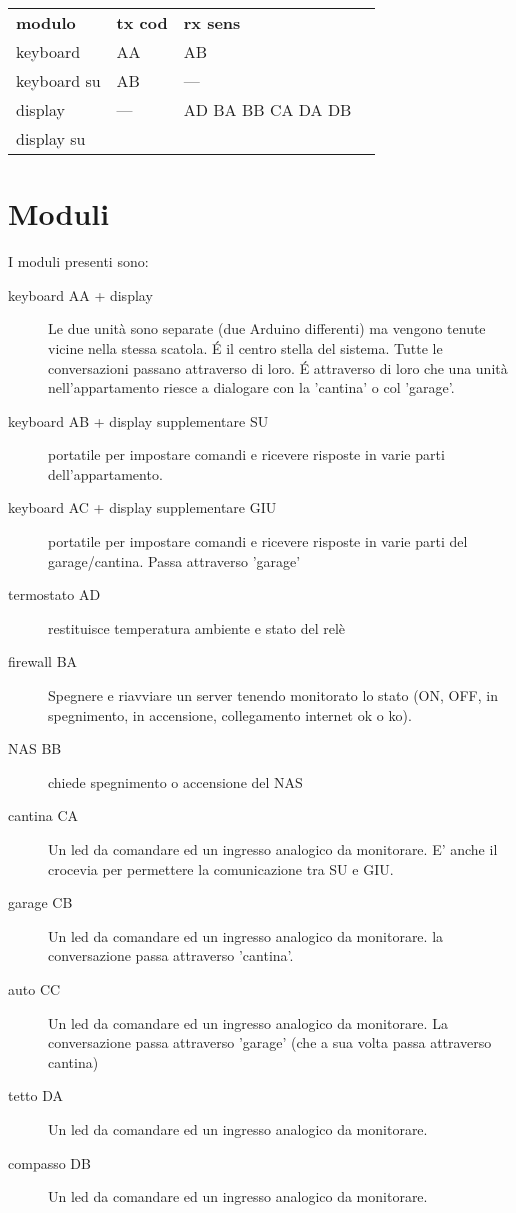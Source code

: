 \documentclass{article}
\begin{document}
    \begin{tabular}{llll}
        \textbf{modulo} & \textbf{tx cod} & \textbf{rx sens} \\
        keyboard & AA & AB \\
        keyboard su & AB & --- \\
        display & --- & AD BA BB CA DA DB\\
        display su & 
    \end{tabular}
    
    \section{Moduli}
    
    I moduli presenti sono:
    
    \begin{description}
         \item [keyboard AA + display] Le due unità sono separate (due Arduino differenti) ma vengono tenute vicine nella stessa scatola. \'E il centro stella del sistema. Tutte le conversazioni passano attraverso di loro. \'E attraverso di loro che una unità nell'appartamento riesce a dialogare con la 'cantina' o col 'garage'.
         
         \item [keyboard AB + display supplementare SU] portatile per impostare comandi e ricevere risposte in varie parti dell'appartamento.

         \item [keyboard AC + display supplementare GIU] portatile per impostare comandi e ricevere risposte in varie parti del garage/cantina. Passa attraverso 'garage'
         
         \item [termostato AD] restituisce temperatura ambiente e stato del relè
         
         \item [firewall BA] Spegnere e riavviare un server tenendo monitorato lo stato (ON, OFF, in spegnimento, in accensione, collegamento internet ok o ko).
         \item [NAS BB] chiede spegnimento o accensione del NAS
         \item [cantina CA] Un led da comandare ed un ingresso analogico da monitorare. E' anche il crocevia per permettere la comunicazione tra SU e GIU.
         \item [garage CB] Un led da comandare ed un ingresso analogico da monitorare. la conversazione passa attraverso 'cantina'.
         \item [auto CC] Un led da comandare ed un ingresso analogico da monitorare. La conversazione passa attraverso 'garage' (che a sua volta passa attraverso cantina)
         \item [tetto DA] Un led da comandare ed un ingresso analogico da monitorare.
         \item [compasso DB] Un led da comandare ed un ingresso analogico da monitorare.
    \end{description}
    
\end{document}
